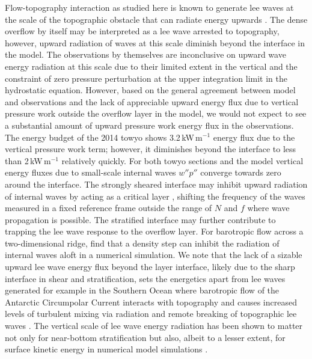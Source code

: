 \documentclass{ametsocV6.1}
\begin{document}
Flow-topography interaction as studied here is known to generate lee waves at the scale of the topographic obstacle that can radiate energy upwards \citep[e.g.][]{gill82}.
The dense overflow by itself may be interpreted as a lee wave arrested to topography, however, upward radiation of waves at this scale diminish beyond the interface in the model.
The observations by themselves are inconclusive on upward wave energy radiation at this scale due to their limited extent in the vertical and the constraint of zero pressure perturbation at the upper integration limit in the hydrostatic equation.
However, based on the general agreement between model and observations and the lack of appreciable upward energy flux due to vertical pressure work outside the overflow layer in the model, we would not expect to see a substantial amount of upward pressure work energy flux in the observations.
The energy budget of the 2014 towyo shows 3.2\,kW\,m$^{-1}$ energy flux due to the vertical pressure work term; however, it diminishes beyond the interface to less than 2\,kW\,m$^{-1}$ relatively quickly.
For both towyo sections and the model vertical energy fluxes due to small-scale internal waves $w''p''$ converge towards zero around the interface.
The strongly sheared interface may inhibit upward radiation of internal waves by acting as a critical layer \citep[e.g.][]{thorpe81}, shifting the frequency of the waves measured in a fixed reference frame outside the range of $N$ and $f$ where wave propagation is possible.
The stratified interface may further contribute to trapping the lee wave response to the overflow layer.
For barotropic flow across a two-dimensional ridge, \citet{jagannathanetal20} find that a density step can inhibit the radiation of internal waves aloft in a numerical simulation.
We note that the lack of a sizable upward lee wave energy flux beyond the layer interface, likely due to the sharp interface in shear and stratification, sets the energetics apart from lee waves generated for example in the Southern Ocean where barotropic flow of the Antarctic Circumpolar Current interacts with topography and causes increased levels of turbulent mixing via radiation and remote breaking of topographic lee waves \citep{naveiraetal04, cusacketal17}.
The vertical scale of lee wave energy radiation has been shown to matter not only for near-bottom stratification but also, albeit to a lesser extent, for surface kinetic energy in numerical model simulations \citep{trossmanetal16}.
\end{document}
